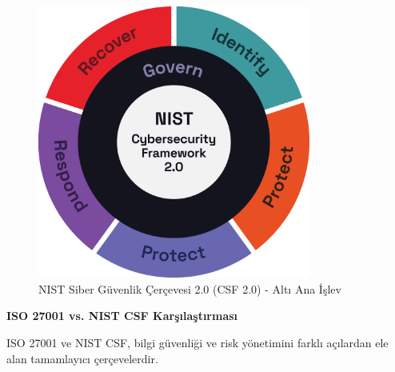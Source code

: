 \begin{figure}[H]
\centering
\includegraphics[width=0.8\textwidth]{img/NIST-cyber-security-framework2.0.png}
\caption{NIST Siber Güvenlik Çerçevesi 2.0 (CSF 2.0) - Altı Ana İşlev}
\label{fig:nist-csf}
\end{figure}

\textbf{ISO 27001 vs. NIST CSF Karşılaştırması}

ISO 27001 ve NIST CSF, bilgi güvenliği ve risk yönetimini farklı açılardan ele alan tamamlayıcı çerçevelerdir.

